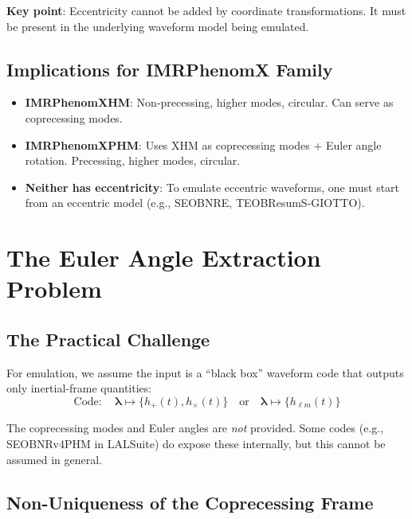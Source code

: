 \documentclass[11pt,a4paper]{article}
\newcommand{\hlm}{h_{\ell m}}
\newcommand{\veclambda}{\bm{\lambda}}
\begin{document}
\textbf{Key point}: Eccentricity cannot be added by coordinate transformations. It must be present in the underlying waveform model being emulated.

\subsection{Implications for IMRPhenomX Family}

\begin{itemize}
    \item \textbf{IMRPhenomXHM}: Non-precessing, higher modes, circular. Can serve as coprecessing modes.
    \item \textbf{IMRPhenomXPHM}: Uses XHM as coprecessing modes + Euler angle rotation. Precessing, higher modes, circular.
    \item \textbf{Neither has eccentricity}: To emulate eccentric waveforms, one must start from an eccentric model (e.g., SEOBNRE, TEOBResumS-GIOTTO).
\end{itemize}

\section{The Euler Angle Extraction Problem}

\subsection{The Practical Challenge}

For emulation, we assume the input is a ``black box'' waveform code that outputs only inertial-frame quantities:
\begin{equation}
    \text{Code}: \quad \veclambda \mapsto \{h_+(t), h_\times(t)\} \quad \text{or} \quad \veclambda \mapsto \{\hlm(t)\}
\end{equation}

The coprecessing modes and Euler angles are \emph{not} provided. Some codes (e.g., SEOBNRv4PHM in LALSuite) do expose these internally, but this cannot be assumed in general.

\subsection{Non-Uniqueness of the Coprecessing Frame}
\label{sec:frame_nonunique}
\end{document}
